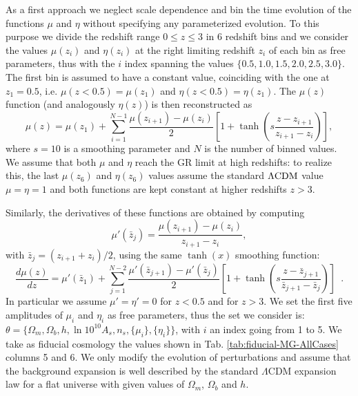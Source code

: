 As a first approach we neglect scale dependence and bin
the time evolution of the functions $\mu$ and $\eta$ without specifying
any parameterized evolution. To this purpose we divide the redshift
range $0\leq z\leq3$ in 6 redshift bins and we consider the values
$\mu(z_{i})$ and $\eta(z_{i})$ at the right limiting redshift $z_{i}$
of each bin as free parameters, thus with the $i$ index spanning the values
$\{0.5,1.0,1.5,2.0,2.5,3.0\}$. The first bin is assumed to have a constant 
value, coinciding with the one at $z_1=0.5$, i.e. $\mu(z<0.5)=\mu(z_{1})$ and $\eta(z<0.5)=\eta(z_{1})$.
The $\mu(z)$ function (and analogously $\eta(z)$) is then reconstructed
as 
\begin{equation}\label{eq:MGbin-mu-parametrization}
\mu(z)=\mu(z_{1})+\sum_{i=1}^{N-1}{\frac{\mu(z_{i+1})-\mu(z_{i})}{2}\left[1+\tanh{\left(s\frac{z-z_{i+1}}{z_{i+1}-z_{i}}\right)}\right]},
\end{equation}
where $s=10$ is a smoothing parameter and $N$ is the number of binned
values. We assume that both $\mu$ and $\eta$ reach the GR limit
at high redshifts: to realize this, the last $\mu(z_{6})$ and $\eta(z_{6})$
values assume the standard $\Lambda\mathrm{CDM}$ value $\mu=\eta=1$ and both functions
are kept constant at higher redshifts $z>3$.

Similarly, the derivatives of these functions are obtained by computing
\begin{equation}
\mu'({\bar{z}_{j}})=\frac{\mu(z_{i+1})-\mu(z_{i})}{z_{i+1}-z_{i}},
\end{equation}
with $\bar{z}_{j}=(z_{i+1}+z_{i})/2$, using the same $\tanh(x)$
smoothing function: 
\begin{equation}\label{eq:MGbin-muderiv-parametrization}
\frac{d\mu(z)}{dz}=\mu'(\bar{z}_{1})+\sum_{j=1}^{N-2}{\frac{\mu'(\bar{z}_{j+1})-\mu'(\bar{z}_{j})}{2}\left[1+\tanh{\left(s\frac{z-\bar{z}_{j+1}}{\bar{z}_{j+1}-\bar{z}_{j}}\right)}\right]}\,\,\,.
\end{equation}
In particular we assume $\mu'=\eta'=0$ for $z<0.5$ and for $z>3$.
We set the first five amplitudes of $\mu_{i}$ and $\eta_{i}$ as
free parameters, thus the set we consider is:
$\theta=\{\Omega_{m},\Omega_{b},h,\ln10^{10} A_{s},n_{s},\{\mu_{i}\},\{\eta_{i}\}\}$,
with $i$ an index going from 1 to 5. We take as fiducial cosmology
the values shown in Tab. \ref{tab:fiducial-MG-AllCases} columns 5
and 6. We only modify the evolution of perturbations and assume that
the background expansion is well described by the standard $\Lambda$CDM
expansion law for a flat universe with given values of $\Omega_{m}$,
$\Omega_{b}$ and $h$.


